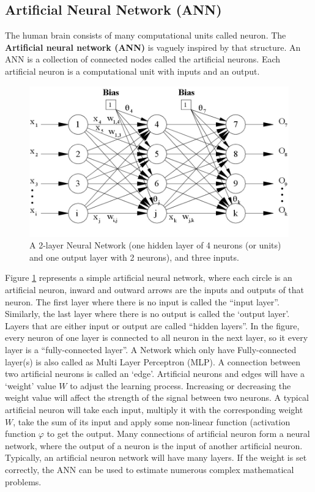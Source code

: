 \subsection{Artificial Neural Network (ANN)}
The human brain consists of many computational units called neuron. The \textbf{Artificial neural network (ANN)} is vaguely inspired by that structure. An ANN is a collection of connected nodes called the artificial neurons. Each artificial neuron is a computational unit with inputs and an output.
\begin{center}
	\begin{figure}[H]
		\centering
		\includegraphics[width=0.75\columnwidth]{images/chap2/NeuralNetwork.jpg}
		\caption{A 2-layer Neural Network (one hidden layer of 4 neurons (or units) and one output layer with 2 neurons), and three inputs.}
		\label{chap2:neural_net}
	\end{figure}
\end{center}
\vspace{-1cm}
Figure \ref{chap2:neural_net} represents a simple artificial neural network, where each circle is an artificial neuron, inward and outward arrows are the inputs and outputs of that neuron. The first layer where there is no input is called the “input layer”. Similarly, the last layer where there is no output is called the ‘output layer’. Layers that are either input or output are called “hidden layers”. In the figure, every neuron of one layer is connected to all neuron in the next layer, so it every layer is a “fully-connected layer”. A Network which only have Fully-connected layer(s) is also called as Multi Layer Perceptron (MLP). A connection between two artificial neurons is called an ‘edge’. Artificial neurons and edges will have a ‘weight’ value \boldmath$W$ to adjust the learning process. Increasing or decreasing the weight value will affect the strength of the signal between two neurons. A typical artificial neuron will take each input, multiply it with the corresponding weight \boldmath$W$, take the sum of its input and apply some non-linear function (activation function \boldmath$\varphi$ to get the output. Many connections of artificial neuron form a neural network, where the output of a neuron is the input of another artificial neuron. Typically, an artificial neuron network will have many layers. If the weight is set correctly, the ANN can be used to estimate numerous complex mathematical problems.

